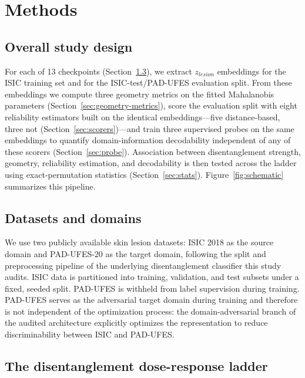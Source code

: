 \section{Methods}
\label{sec:methods}

\subsection{Overall study design}
\label{sec:study-design}

For each of 13 checkpoints (Section~\ref{sec:ladder}), we extract $z_{lesion}$ embeddings for the ISIC training set and for the ISIC-test/PAD-UFES evaluation split. From these embeddings we compute three geometry metrics on the fitted Mahalanobis parameters (Section~\ref{sec:geometry-metrics}), score the evaluation split with eight reliability estimators built on the identical embeddings---five distance-based, three not (Section~\ref{sec:scorers})---and train three supervised probes on the same embeddings to quantify domain-information decodability independent of any of these scorers (Section~\ref{sec:probe}). Association between disentanglement strength, geometry, reliability estimation, and decodability is then tested across the ladder using exact-permutation statistics (Section~\ref{sec:stats}). Figure~\ref{fig:schematic} summarizes this pipeline.



\subsection{Datasets and domains}
\label{sec:datasets}

We use two publicly available skin lesion datasets: ISIC 2018 \citep{codella2019skin,tschandl2018ham10000} as the source domain and PAD-UFES-20 \citep{pacheco2020padufes} as the target domain, following the split and preprocessing pipeline of the underlying disentanglement classifier this study audits. ISIC data is partitioned into training, validation, and test subsets under a fixed, seeded split. PAD-UFES is withheld from label supervision during training. PAD-UFES serves as the adversarial target domain during training and therefore is not independent of the optimization process: the domain-adversarial branch of the audited architecture explicitly optimizes the representation to reduce discriminability between ISIC and PAD-UFES.

\subsection{The disentanglement dose-response ladder}
\label{sec:ladder}

